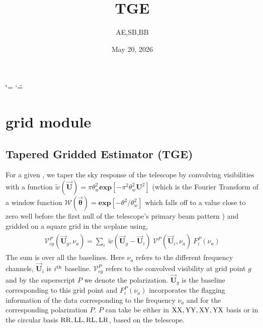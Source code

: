 \documentclass[a4paper,11pt,oneside,english,openany]{sphinxmanual}
\title{TGE}
\date{May 20, 2026}
\author{AE,SB,BB}
\begin{document}
\ifdefined\shorthandoff
  \ifnum\catcode`\=\string=\active\shorthandoff{=}\fi
  \ifnum\catcode`\"=\active{}\fi
\fi

\pagestyle{empty}
\sphinxmaketitle
\pagestyle{plain}
\sphinxtableofcontents
\pagestyle{normal}
\label{\detokenize{index::doc}}
\sphinxstepscope



\sphinxstepscope


\chapter{grid module}
\label{\detokenize{grid:module-grid}}\label{\detokenize{grid:grid-module}}\label{\detokenize{grid::doc}}

\section{Tapered Gridded Estimator (TGE)}
\label{\detokenize{grid:tapered-gridded-estimator-tge}}
\sphinxAtStartPar
For a given , we taper the sky response of the telescope by convolving visibilities with a function \(\tilde{w}(\vec{\textbf{U}})=\pi \theta_w^2 \textbf{exp}[-\pi^2 \theta_w^2 \textbf{U}^2]\) (which is the Fourier Transform of a window function \(\mathcal{W}(\vec{\boldsymbol{\theta}}) = \textbf{exp}[-\theta^2/\theta_w^2]\) which falls off to a value close to zero well before the first null of the telescope’s primary beam pattern ) and gridded on a square grid in the \(uv\)\sphinxhyphen{}plane using,
\begin{equation*}
\begin{split}\begin{align}
\boxed{\mathcal{V}_{cg}^{P}(\vec{\textbf{U}}_g,\nu_a)=\sum_{i}\  \tilde{w}(\vec{\textbf{U}}_g - \vec{\textbf{U}}_i)\ \mathcal{V}^{P}(\vec{\textbf{U}}_i,\nu_a)\ F_i^{P}(\nu_a)}
\end{align}\end{split}
\end{equation*}
\sphinxAtStartPar
The sum is over all the baselines. Here \(\nu_a\) refers to the different frequency channels, \(\vec{\textbf{U}}_i\) is \(i^{\rm th}\) baseline. \(\mathcal{V}_{cg}^{P}\) refers to the convolved visibility at grid point \(g\) and by the superscript \(P\) we denote the polarization. \(\vec{\textbf{U}}_g\) is the baseline corresponding to this grid point and \(F_i^{P}(\nu_a)\) incorporates the flagging information of the data corresponding to the frequency \(\nu_a\) and for the corresponding polarization \(P\). \(P\) can take be either in  \(\rm XX,YY,XY,YX\) basis or in the circular basis \(\rm RR,LL,RL,LR\), based on the telescope.
\end{document}
